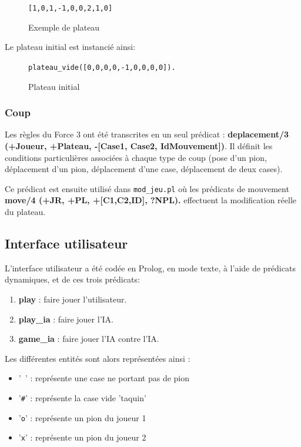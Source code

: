 \documentclass[a4paper,12pt]{article}
\newcommand{\code}[1]{\texttt{#1}}
\begin{document}
  \begin{figure}[H]
    \code{[1,0,1,-1,0,0,2,1,0]}
    \centering
    \caption{Exemple de plateau}
  \end{figure}
  
Le plateau initial est instancié ainsi:\\
  \begin{figure}[H]
\code{plateau\_vide([0,0,0,0,-1,0,0,0,0]).}
    \centering
    \caption{Plateau initial}
  \end{figure}

\subsubsection{Coup}
Les règles du Force 3 ont été transcrites en un seul prédicat : \textbf{deplacement/3 (+Joueur, +Plateau, -[Case1, Case2, IdMouvement])}. Il définit les conditions particulières associées à chaque type de coup (pose d'un pion, déplacement d'un pion, déplacement d'une case, déplacement de deux cases).

Ce prédicat est ensuite utilisé dans \texttt{mod\_jeu.pl} où les prédicats de mouvement \textbf{move/4 (+JR, +PL, +[C1,C2,ID], ?NPL).} effectuent la modification réelle du plateau.

\subsection{Interface utilisateur}
L'interface utilisateur a été codée en Prolog, en mode texte, à l'aide de prédicats dynamiques, et de
ces trois prédicats:

\begin{enumerate}
    \item \textbf{play} : faire jouer l'utilisateur.
    \item \textbf{play\_ia} : faire jouer l'IA.
    \item \textbf{game\_ia} : faire jouer l'IA contre l'IA.
\end{enumerate}
Les différentes entités sont alors représentées ainsi :

\begin{itemize}
    \item{'\texttt{ }' : représente une case ne portant pas de pion}
    \item{'\texttt{\#}' : représente la case vide 'taquin'}
    \item{'\texttt{o}' : représente un pion du joueur 1}
    \item{'\texttt{x}' : représente un pion du joueur 2}
\end{itemize}
\end{document}
